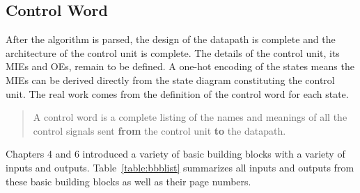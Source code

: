 
\subsection{Control Word}
After the algorithm is parsed, the design of the datapath is complete
and the architecture of the control unit is complete.  The details of 
the control unit, its MIEs and OEs, remain to be defined.  A 
one-hot encoding of the states means the MIEs can be derived directly
from the state diagram constituting the control unit.  The real work
comes from the definition of the control word for each state.

\begin{quote}
A control word is a complete listing of the names and meanings of 
all the control signals sent {\bf from} the control unit {\bf to} the
datapath.  
\end{quote}

Chapters 4 and 6 introduced a variety of basic building
blocks with a variety of inputs and outputs.  Table~\ref{table:bbblist}
summarizes all inputs and outputs from these basic building blocks
as well as their page numbers.

